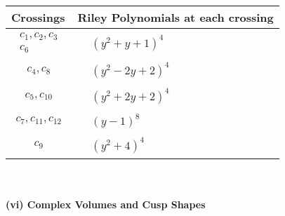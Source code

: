 \documentclass[1p]{elsarticle_modified}
\theoremstyle{definition}
\begin{document}
\begin{tabular}{m{50pt}|m{274pt}}
Crossings & \hspace{64pt}Riley Polynomials at each crossing \\
\hline $$\begin{aligned}c_{1},c_{2},c_{3}\\c_{6}\end{aligned}$$&$\begin{aligned}
&(y^2+y+1)^4
\end{aligned}$\\
\hline $$\begin{aligned}c_{4},c_{8}\end{aligned}$$&$\begin{aligned}
&(y^2-2 y+2)^4
\end{aligned}$\\
\hline $$\begin{aligned}c_{5},c_{10}\end{aligned}$$&$\begin{aligned}
&(y^2+2 y+2)^4
\end{aligned}$\\
\hline $$\begin{aligned}c_{7},c_{11},c_{12}\end{aligned}$$&$\begin{aligned}
&(y-1)^8
\end{aligned}$\\
\hline $$\begin{aligned}c_{9}\end{aligned}$$&$\begin{aligned}
&(y^2+4)^4
\end{aligned}$\\
\hline
\end{tabular}\\~\\
\newpage\flushleft \textbf{(vi) Complex Volumes and Cusp Shapes}
\end{document}
